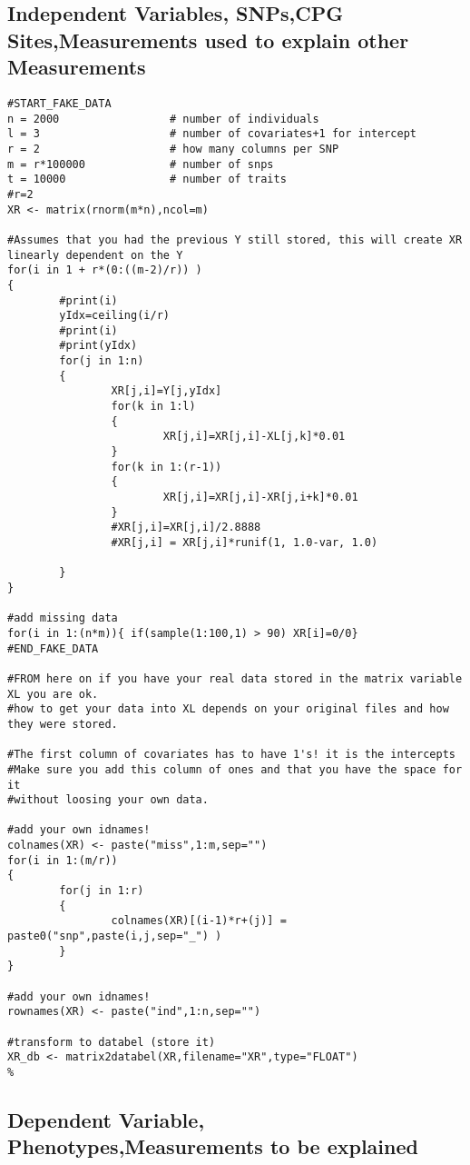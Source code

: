\subsection{Independent Variables, SNPs,CPG Sites,Measurements used to explain other Measurements}
\begin{lstlisting}[escapechar=\%]
#START_FAKE_DATA
n = 2000                 # number of individuals
l = 3                    # number of covariates+1 for intercept
r = 2                    # how many columns per SNP
m = r*100000             # number of snps
t = 10000                # number of traits
#r=2
XR <- matrix(rnorm(m*n),ncol=m)

#Assumes that you had the previous Y still stored, this will create XR linearly dependent on the Y
for(i in 1 + r*(0:((m-2)/r)) )
{
        #print(i)
        yIdx=ceiling(i/r)
        #print(i)
        #print(yIdx)
        for(j in 1:n)
        {
                XR[j,i]=Y[j,yIdx]
                for(k in 1:l)
                {
                        XR[j,i]=XR[j,i]-XL[j,k]*0.01
                }
                for(k in 1:(r-1))
                {
                        XR[j,i]=XR[j,i]-XR[j,i+k]*0.01
                }
                #XR[j,i]=XR[j,i]/2.8888
                #XR[j,i] = XR[j,i]*runif(1, 1.0-var, 1.0)

        }
}

#add missing data
for(i in 1:(n*m)){ if(sample(1:100,1) > 90) XR[i]=0/0}
#END_FAKE_DATA

#FROM here on if you have your real data stored in the matrix variable XL you are ok.
#how to get your data into XL depends on your original files and how they were stored.

#The first column of covariates has to have 1's! it is the intercepts
#Make sure you add this column of ones and that you have the space for it
#without loosing your own data.

#add your own idnames!
colnames(XR) <- paste("miss",1:m,sep="")
for(i in 1:(m/r))
{
        for(j in 1:r)
        {
                colnames(XR)[(i-1)*r+(j)] = paste0("snp",paste(i,j,sep="_") )
        }
}

#add your own idnames!
rownames(XR) <- paste("ind",1:n,sep="")

#transform to databel (store it)
XR_db <- matrix2databel(XR,filename="XR",type="FLOAT")
%
\end{lstlisting}

\subsection{Dependent Variable, Phenotypes,Measurements to be explained}

